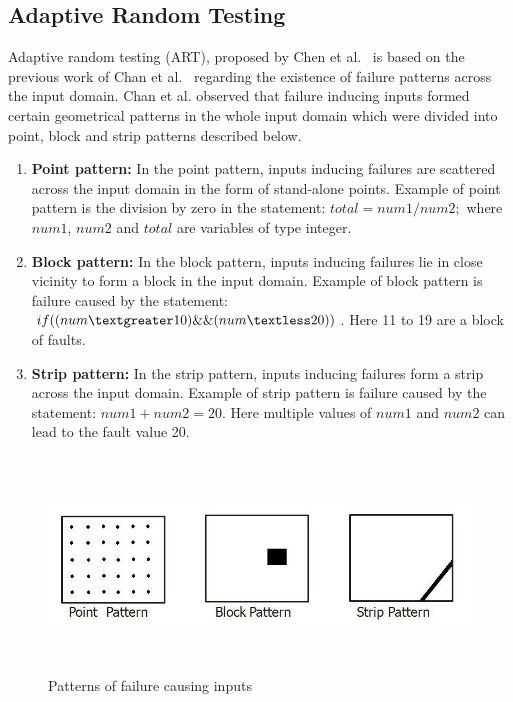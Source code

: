 \subsection{Adaptive Random Testing}
Adaptive random testing (ART), proposed by Chen et al.~\cite{Chen2008} is based on the previous work of Chan et al.~\cite{Chan1996} regarding the existence of failure patterns across the input domain. Chan et al. observed that failure inducing inputs formed certain geometrical patterns in the whole input domain which were divided into point, block and strip patterns described below.

\begin{enumerate}
\item {\bf Point pattern:} In the point pattern, inputs inducing failures are scattered across the input domain in the form of stand-alone points. Example of point pattern is the division by zero in the statement: $total = num1/num2;$ where $num1$, $num2$ and $total$ are variables of type integer.
\item {\bf Block pattern:} In the block pattern, inputs inducing failures lie in close vicinity to form a block in the input domain. Example of block pattern is failure caused by the statement: $if ( (num \textgreater 10) \&\& (num \textless 20) )$. Here 11 to 19 are a block of faults.
\item {\bf Strip pattern:} In the strip pattern, inputs inducing failures form a strip across the input domain. Example of strip pattern is failure caused by the statement: $num1 + num2 = 20$. Here multiple values of $num1$ and $num2$ can lead to the fault value 20. 
\end{enumerate}

\begin{figure}[h]
	\centering
	\includegraphics[width=13cm, height=5.7cm ]{chapter3/pointblockstrip.jpg}
	\caption{Patterns of failure causing inputs~\cite{Chan1996}}
	\label{fig:patterns2}
\end{figure}

